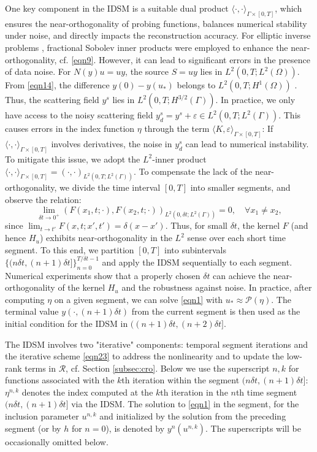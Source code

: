\documentclass[onefignum,onetabnum]{siamart190516}
\numberwithin{equation}{section}
\begin{document}
One key component in the IDSM is a suitable dual product $\langle\cdot, \cdot\rangle_{\Gamma\times [0,T]}$, which ensures the near-orthogonality of probing functions, balances numerical stability under noise, and directly impacts the reconstruction accuracy. For elliptic inverse problems \cite{Zou2021,Zou2022,Zou2015,Zou2014,ChowItoZou:2018sisc}, fractional Sobolev inner products were employed to enhance the near-orthogonality, cf. \eqref{eqn9}.
However, it can lead to significant errors in the presence of data noise.
For $N(y)u = uy$, the source $S = uy$ lies in $L^{2}(0,T; L^{2}(\Omega))$.
From \eqref{eqn14}, the difference $y(0) - y(u_{*})$ belongs to $L^{2}(0,T; H^{1}(\Omega))$ \cite[Theorem 5, Chapter 7]{Evans2010}.
Thus, the scattering field $y^{s}$ lies in $L^{2}(0,T; H^{3/2}(\Gamma))$.
In practice, we only have access to the noisy scattering field $y^{s}_{d} = y^{s} + \varepsilon \in L^{2}(0,T; L^{2}(\Gamma))$.
This causes errors in the index function $\eta$ through the term $\langle K, \varepsilon \rangle_{\Gamma \times [0,T]}$:
If $\langle \cdot, \cdot \rangle_{\Gamma \times [0,T]}$ involves derivatives, the noise in $y^{s}_{d}$ can lead to numerical instability.
To mitigate this issue, we adopt the $L^{2}$-inner product $\langle \cdot, \cdot \rangle_{\Gamma \times [0,T]} = (\cdot, \cdot)_{L^{2}(0,T; L^{2}(\Gamma))}$.
To compensate the lack of the near-orthogonality, we divide the time interval $[0,T]$ into smaller segments, and observe the relation:
\begin{equation*}
\lim_{\delta t \to 0^{+}} \left(F(x_{1},t; \cdot), F(x_{2}, t; \cdot) \right)_{L^{2}(0,\delta t; L^{2}(\Gamma))} = 0, \quad \forall x_{1} \neq x_{2},
\end{equation*}
since $\lim_{t \to t'} F(x,t; x',t') = \delta(x - x')$.
Thus, for small $\delta t$, the kernel $F$ (and hence $H_{u}$) exhibits near-orthogonality in the $L^{2}$ sense over each short time segment.
To this end, we partition $[0,T]$ into subintervals $\{(n\delta t, (n+1)\delta t]\}_{n=0}^{T/\delta t - 1}$ and apply the IDSM sequentially to each segment. Numerical experiments show that a properly chosen $\delta t$ can achieve the near-orthogonality of the kernel $H_{u}$ and the robustness against noise. In practice, after computing $\eta$ on a given segment, we can solve \eqref{eqn1} with $u_{*} \approx\mathcal{P}(\eta)$.
The terminal value $y(\cdot, (n+1)\delta t)$ from the current segment is then used as the initial condition for the IDSM in $((n+1)\delta t, (n+2)\delta t]$.

The IDSM involves two "iterative" components: temporal segment iterations and the iterative scheme \eqref{eqn23} to address the nonlinearity and to update the low-rank terms in $\mathcal{R}$, cf. Section \ref{subsec:cro}.
Below we use the superscript $n,k$ for functions associated with the $k$th iteration within the segment $(n\delta t, (n+1)\delta t]$: $\eta^{n,k}$ denotes the index computed at the $k$th iteration in the $n$th time segment $(n\delta t, (n+1)\delta t]$ via the IDSM.
The solution to \eqref{eqn1} in the segment, for the inclusion parameter $u^{n,k}$ and initialized by the solution from the preceding segment (or by $h$ for $n=0$), is denoted by $y^{n}(u^{n,k})$.
The superscripts will be occasionally omitted below.
\end{document}
